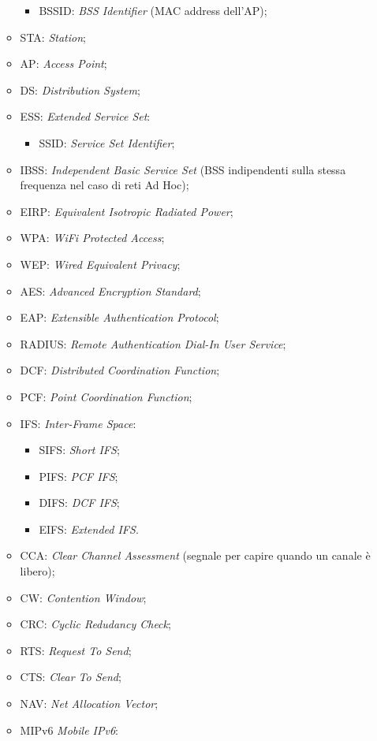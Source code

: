 \begin{itemize}
\begin{itemize}
\begin{itemize}
\item{BSSID}: \emph{BSS Identifier} (MAC address dell’AP);
\end{itemize}

\item{STA}: \emph{Station};
\item{AP}: \emph{Access Point};
\item{DS}: \emph{Distribution System};
\item{ESS}: \emph{Extended Service Set}:

\begin{itemize}
\item{SSID}: \emph{Service Set Identifier};
\end{itemize}

\item{IBSS}: \emph{Independent Basic Service Set} (BSS indipendenti sulla stessa frequenza nel caso di reti Ad Hoc);
\item{EIRP}: \emph{Equivalent Isotropic Radiated Power};
\item{WPA}: \emph{WiFi Protected Access};
\item{WEP}: \emph{Wired Equivalent Privacy};
\item{AES}: \emph{Advanced Encryption Standard};
\item{EAP}: \emph{Extensible Authentication Protocol};
\item{RADIUS}: \emph{Remote Authentication Dial-In User Service};
\item{DCF}: \emph{Distributed Coordination Function};
\item{PCF}: \emph{Point Coordination Function};
\item{IFS}: \emph{Inter-Frame Space}:

\begin{itemize}

\item{SIFS}: \emph{Short IFS};
\item{PIFS}: \emph{PCF IFS};
\item{DIFS}: \emph{DCF IFS};
\item{EIFS}: \emph{Extended IFS}.

\end{itemize}

\item{CCA}: \emph{Clear Channel Assessment} (segnale per capire quando un canale è libero);
\item{CW}: \emph{Contention Window};
\item{CRC}: \emph{Cyclic Redudancy Check};
\item{RTS}: \emph{Request To Send};
\item{CTS}: \emph{Clear To Send};
\item{NAV}: \emph{Net Allocation Vector};
\item{MIPv6} \emph{Mobile IPv6}:


\end{itemize}
\end{itemize}
